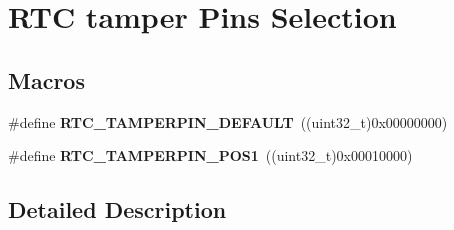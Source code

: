 \hypertarget{group___r_t_c_ex___tamper___pins___selection}{}\section{R\+TC tamper Pins Selection}
\label{group___r_t_c_ex___tamper___pins___selection}
\subsection*{Macros}
\begin{DoxyCompactItemize}
\item 
\#define {\bfseries R\+T\+C\+\_\+\+T\+A\+M\+P\+E\+R\+P\+I\+N\+\_\+\+D\+E\+F\+A\+U\+LT}~((uint32\+\_\+t)0x00000000)\hypertarget{group___r_t_c_ex___tamper___pins___selection_gaa72ee32c246f9957ffbe30ff4bfcb96b}{}\label{group___r_t_c_ex___tamper___pins___selection_gaa72ee32c246f9957ffbe30ff4bfcb96b}

\item 
\#define {\bfseries R\+T\+C\+\_\+\+T\+A\+M\+P\+E\+R\+P\+I\+N\+\_\+\+P\+O\+S1}~((uint32\+\_\+t)0x00010000)\hypertarget{group___r_t_c_ex___tamper___pins___selection_ga9ad3dfb9f322a83fa90ed267e4b18aa8}{}\label{group___r_t_c_ex___tamper___pins___selection_ga9ad3dfb9f322a83fa90ed267e4b18aa8}

\end{DoxyCompactItemize}


\subsection{Detailed Description}
